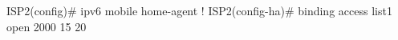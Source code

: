 ISP2(config)# ipv6 mobile home-agent              
!
ISP2(config-ha)# binding access list1 open 2000 15 20